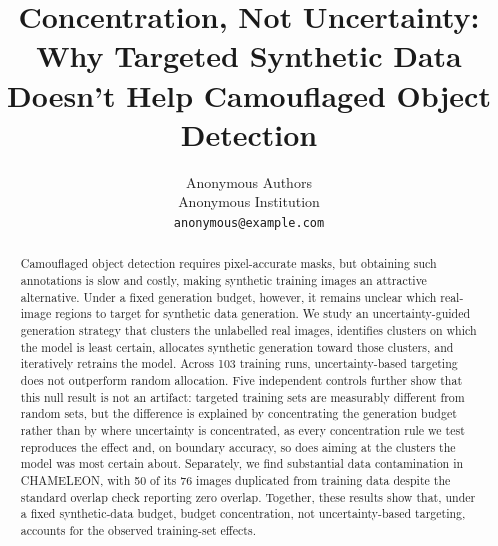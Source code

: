 \documentclass{article}
\title{Concentration, Not Uncertainty: Why Targeted Synthetic Data Doesn't Help Camouflaged Object Detection}
\author{Anonymous Authors \\
Anonymous Institution \\
\texttt{anonymous@example.com}
}
\begin{document}
\maketitle

\begin{abstract}
%

Camouflaged object detection requires pixel-accurate masks, but obtaining such annotations is slow and costly, making synthetic training images an attractive alternative. Under a fixed generation budget, however, it remains unclear which real-image regions to target for synthetic data generation. We study an uncertainty-guided generation strategy that clusters the unlabelled real images, identifies clusters on which the model is least certain, allocates synthetic generation toward those clusters, and iteratively retrains the model. Across 103 training runs, uncertainty-based targeting does not outperform random allocation. Five independent controls further show that this null result is not an artifact: targeted training sets are measurably different from random sets, but the difference is explained by concentrating the generation budget rather than by where uncertainty is concentrated, as every concentration rule we test reproduces the effect and, on boundary accuracy, so does aiming at the clusters the model was most certain about. Separately, we find substantial data contamination in CHAMELEON, with 50 of its 76 images duplicated from training data despite the standard overlap check reporting zero overlap. Together, these results show that, under a fixed synthetic-data budget, budget concentration, not uncertainty-based targeting, accounts for the observed training-set effects.
\end{abstract}
\end{document}
